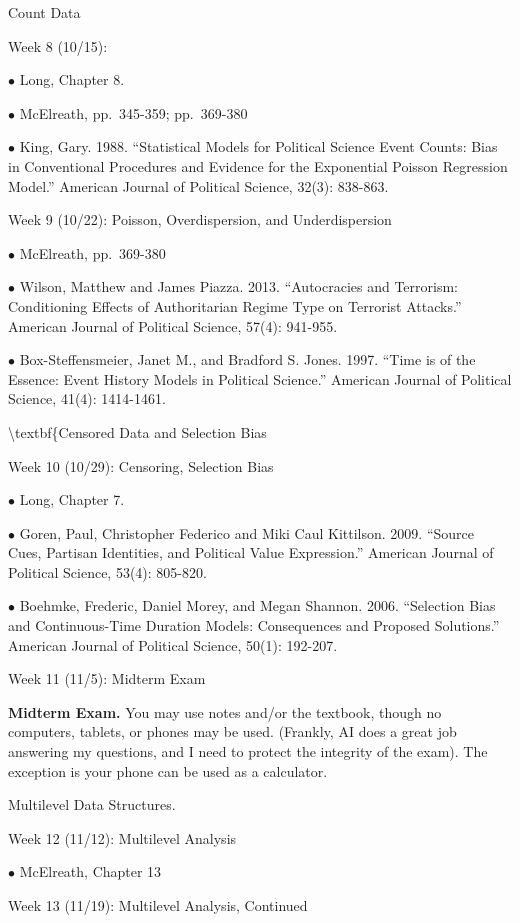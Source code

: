 \documentclass[
]{book}
\begin{document}
Count Data

Week 8 (10/15):

\(\bullet\) Long, Chapter 8.

\(\bullet\) McElreath, pp.~345-359; pp.~369-380

\(\bullet\) King, Gary. 1988. ``Statistical Models for Political Science Event Counts: Bias in Conventional Procedures and Evidence for the Exponential Poisson Regression Model.'' American Journal of Political Science, 32(3): 838-863.

Week 9 (10/22): Poisson, Overdispersion, and Underdispersion

\(\bullet\) McElreath, pp.~369-380

\(\bullet\) Wilson, Matthew and James Piazza. 2013. ``Autocracies and Terrorism: Conditioning Effects of Authoritarian Regime Type on Terrorist Attacks.'' American Journal of Political Science, 57(4): 941-955.

\(\bullet\) Box-Steffensmeier, Janet M., and Bradford S. Jones. 1997. ``Time is of the Essence: Event History Models in Political Science.'' American Journal of Political Science, 41(4): 1414-1461.

\textbackslash textbf\{Censored Data and Selection Bias

Week 10 (10/29): Censoring, Selection Bias

\(\bullet\) Long, Chapter 7.

\(\bullet\) Goren, Paul, Christopher Federico and Miki Caul Kittilson. 2009. ``Source Cues, Partisan Identities, and Political Value Expression.'' American Journal of Political Science, 53(4): 805-820.

\(\bullet\) Boehmke, Frederic, Daniel Morey, and Megan Shannon. 2006. ``Selection Bias and Continuous-Time Duration Models: Consequences and Proposed Solutions.'' American Journal of Political Science, 50(1): 192-207.

Week 11 (11/5): Midterm Exam

\textbf{Midterm Exam.} You may use notes and/or the textbook, though no computers, tablets, or phones may be used. (Frankly, AI does a great job answering my questions, and I need to protect the integrity of the exam). The exception is your phone can be used as a calculator.

Multilevel Data Structures.

Week 12 (11/12): Multilevel Analysis

\(\bullet\) McElreath, Chapter 13

Week 13 (11/19): Multilevel Analysis, Continued
\end{document}
